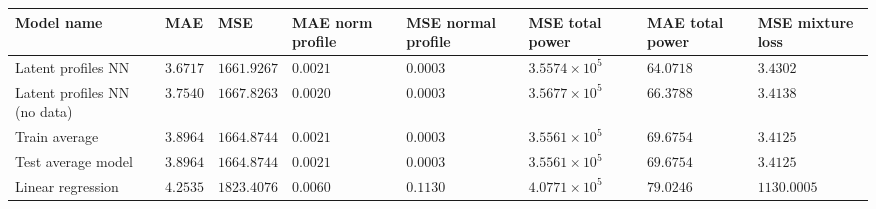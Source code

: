\begin{table*}[h!]
    \begin{tabular}{p{3cm} p{1.5cm} p{2cm} p{1.3cm} p{1.3cm} p{2cm} p{1.6cm} p{1.6cm}}

        \toprule

        \textbf{Model name}          & \textbf{MAE}                         & \textbf{MSE}                         & \textbf{MAE norm profile}         & \textbf{MSE normal profile}       & \textbf{MSE total power}          & \textbf{MAE total power}             & \textbf{MSE mixture loss}         \\

        \midrule

        Latent profiles NN           & $3.6717$                             & $1661.9267$                          & $0.0021$                          & $0.0003$                          & $3.5574\times10^{5}$              & $64.0718$                            & $3.4302$                          \\

        Latent profiles NN (no data) & $3.7540$                             & $1667.8263$                          & $0.0020$                          & $0.0003$                          & $3.5677\times10^{5}$              & $66.3788$                            & $3.4138$                          \\

        Train average                & $3.8964$                             & $1664.8744$                          & $0.0021$                          & $0.0003$                          & $3.5561\times10^{5}$              & $69.6754$                            & $3.4125$                          \\

        Test average model           & $3.8964$                             & $1664.8744$                          & $0.0021$                          & $0.0003$                          & $3.5561\times10^{5}$              & $69.6754$                            & $3.4125$                          \\

        Linear regression            & $4.2535$                             & $1823.4076$                          & $0.0060$                          & $0.1130$                          & $4.0771\times10^{5}$              & $79.0246$                            & $1130.0005$                       \\


\end{tabular}
\end{table*}

